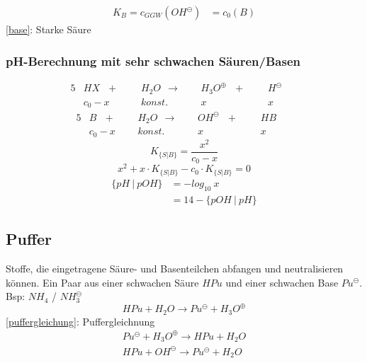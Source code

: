 {\large
	\begin{equation}
	\label{base}
	\begin{split}
	K_B=c_{GGW}(OH^\ominus) &= c_0(B)
	\end{split}
	\end{equation}	
}
\ref{base}: Starke Säure
\subsubsection{pH-Berechnung mit sehr schwachen Säuren/Basen}

\begin{alignat*}{5}
	&HX \ \ \ +\ \ \ &&H_2O\ \ \rightarrow \ \ &&H_3O^\oplus \ \ \ +\ \ \ &&H^\ominus && \\
	&c_0 - x && konst. && x && x &&
\end{alignat*}
\begin{alignat*}{5}
	&B \ \ \ +\ \ \ &&H_2O\ \ \rightarrow \ \ &&OH^\ominus \ \ \ +\ \ \ &&HB && \\
	&c_0 - x && konst. && x && x &&
\end{alignat*}
{\large
	\begin{equation}
		K_{\{S|B\}} = \frac{x^2}{c_0-x}
	\end{equation}	
}
{\large
	\begin{equation}
	x^2 + x\cdot K_{\{S|B\}} - c_0 \cdot K_{\{S|B\}} = 0
	\end{equation}
}
{\large
	\begin{equation}
	\begin{split}
		\{pH\ |\ pOH\}&=-log_{10}\ x \\
		&=14-\{pOH\  |\  pH\}
	\end{split}
	\end{equation}
}
\subsection{Puffer}
Stoffe, die eingetragene Säure- und Basenteilchen abfangen und neutralisieren können.
Ein Paar aus einer schwachen Säure $HPu$ und einer schwachen Base $Pu^\ominus$. Bsp: $NH_4$ / $NH_3^\ominus$
{\large
\begin{equation}
	\label{puffergleichung}
	HPu + H_2O \rightarrow Pu^\ominus + H_3O^\oplus	
\end{equation}
}
\ref{puffergleichung}: Puffergleichnung
{\large
	\begin{equation}
	\label{pufferausgleich}
	\begin{split}
	Pu^\ominus + H_3O^\oplus \rightarrow HPu + H_2O \\
	HPu + OH^\ominus \rightarrow Pu^\ominus + H_2O
	\end{split}
	\end{equation}
}


